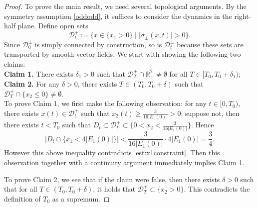 \documentclass[11pt,reqno]{amsproc}
\newcommand{\R}{\mathbb{R}}
\newcommand{\calD}{\mathcal{D}}
\begin{document}
\begin{proof}
    To prove the main result, we need several topological arguments. By the symmetry assumption \eqref{oddodd}, it suffices to consider the dynamics in the right-half plane. Define open sets
    $$
    \calD_t^\pm := \{x \in \{x_1 > 0\}\;|\; |\sigma_\pm(x,t)| > 0\}.
    $$
    Since $\calD_0^\pm$ is simply connected by construction, so is $\calD_t^\pm$ because these sets are transported by smooth vector fields. We start with showing the following two claims:\\
    
    \noindent\textbf{Claim 1.} There exists $\delta_1 > 0$ such that $\calD_T^+ \cap \R_+^2 \neq \emptyset$ for all $T \in [T_0, T_0 + \delta_1)$;\\
    \noindent\textbf{Claim 2.} For any $\delta > 0$, there exists $T \in (T_0, T_0 + \delta)$ such that $\calD_T^+ \cap \{x_2 \le 0\} \neq \emptyset$.\\
    
    To prove Claim 1, we first make the following observation: for any $t \in [0,T_0)$, there exists $x(t) \in \calD_t^+$ such that $x_2(t) \ge \frac{3}{16|E_1(0)|} > 0$: suppose not, then there exists $t < T_0$ such that $D_t \subset \calD_t^+ \subset \{0<x_2 < \frac{3}{16|E_1(0)|}\}$. Hence
    $$
    |D_t \cap \{x_1 < 4|E_1(0)|\}| < \frac{3}{16|E_1(0)|}\cdot 4|E_1(0)| = \frac34.
    $$
    However this above inequality contradicts \eqref{est:x1constraint}. Then this observation together with a continuity argument immediately implies Claim 1.
    

    To prove Claim 2, we see that if the claim were false, then there exists $\delta > 0$ such that for all $T \in (T_0, T_0 + \delta)$, it holds that $\calD_T^+ \subset \{x_2 > 0\}$. This contradicts the definition of $T_0$ as a supremum.


\end{proof}
\end{document}
